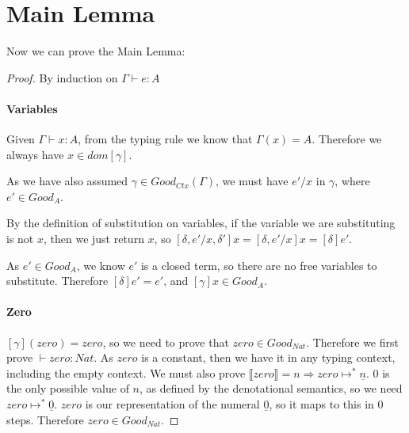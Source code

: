 

\section{Main Lemma}
 
Now we can prove the Main Lemma:

\begin{proof}
By induction on $\Gamma \vdash e : A$

\paragraph{Variables} 
Given $\Gamma \vdash x : A$, from the typing rule we know that $\Gamma(x) = A$. Therefore we always have $x \in dom [\gamma]$.

As we have also assumed $\gamma \in Good_{Ctx}(\Gamma)$, we must have $e'/x$ in $\gamma$, where $e' \in Good_A$. 

By the definition of substitution on variables, if the variable we are substituting is not $x$, then we just return $x$, so $[ \delta, e'/x, \delta']x = [\delta, e'/x]x = [\delta]e'$. 

As $e' \in Good_A$, we know $e'$ is a closed term, so there are no free variables to substitute. Therefore $[\delta]e' = e'$, and $[\gamma]x \in Good_A$.  



\paragraph{Zero} $[\gamma](zero) = zero$, so we need to prove that $zero \in Good_{Nat}$. Therefore we first prove $\vdash zero : Nat$. As $zero$ is a constant, then we have it in any typing context, including the empty context. We must also prove $\llbracket zero \rrbracket = n \Rightarrow zero \mapsto^* \underline{n}$. 0 is the only possible value of $n$, as defined by the denotational semantics, so we need $zero \mapsto^* \underline{0}$. $zero$ is our representation of the numeral $\underline{0}$, so it maps to this in 0 steps. Therefore $zero \in Good_{Nat}$.


\end{proof}
